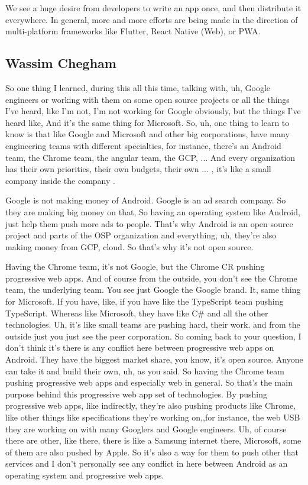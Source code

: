 			We see a huge desire from developers to write an app once, and then distribute it everywhere. In general, more and more efforts are being made in the direction of multi-platform frameworks like Flutter, React Native (Web), or PWA. 

		\subsection{Wassim Chegham}
			So one thing I learned,  during this all this time, talking with, uh, Google engineers or working with them on some open source projects or all the things I've heard, like I'm not, I'm not working for Google obviously, but the things I've heard like, And it's the same thing for Microsoft. So, uh, one thing to learn to know is that like Google and Microsoft and other big corporations, have many engineering teams with different specialties, for instance, there's an Android team, the Chrome team, the angular team, the GCP, ... And every organization has their own priorities, their own budgets, their own ... , it's like a small company inside the company .
			
			Google is not making money of Android. Google is an ad search company. So they are making big money on that, So having an operating system like Android, just help them push more ads to people. That's why Android is an open source project and parts of the OSP organization and everything, uh, they're also making money from GCP,  cloud. So that's why it's not open source.
			
			Having the Chrome team, it's not Google, but the Chrome CR pushing progressive web apps. And of course from the outside, you don't see the Chrome team, the underlying team. You see just Google the Google brand. It, same thing for Microsoft. If you have, like, if you have like the TypeScript team pushing TypeScript. Whereas like Microsoft, they have like C\# and all the other technologies. Uh, it's like small teams are pushing hard, their work. and from the outside just you just see the peer corporation. So coming back to your question, I don't think it's there is any conflict here between progressive web apps on Android. They have the biggest market share, you know, it's open source. Anyone can take it and build their own, uh, as you said. So having the Chrome team pushing progressive web apps and especially web in general. So that's the main purpose behind this progressive web app set of technologies. By pushing progressive web apps, like indirectly, they're also pushing products like Chrome, like other things like specifications they're working on,,for instance, the web USB they are working on with many Googlers and Google engineers. Uh, of course there are other, like there, there is like a Samsung internet there, Microsoft, some of them are also pushed by Apple. So it's also a way for them to push other that services and I don't personally see any conflict in here between Android as an operating system and progressive web apps.
			
